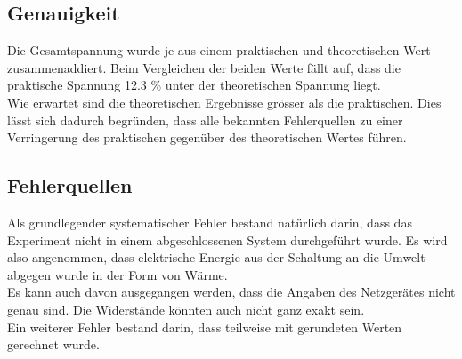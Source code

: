 \documentclass[a4paper,12pt]{article}
\begin{document}
\subsection{Genauigkeit}

Die Gesamtspannung wurde je aus einem praktischen und theoretischen Wert zusammenaddiert. Beim Vergleichen der beiden Werte fällt auf, dass die praktische Spannung 12.3 \% unter der theoretischen Spannung liegt.\\

Wie erwartet sind die theoretischen Ergebnisse grösser als die praktischen. Dies lässt sich dadurch begründen, dass alle bekannten Fehlerquellen zu einer Verringerung des praktischen gegenüber des theoretischen Wertes führen.





\subsection{Fehlerquellen}

Als grundlegender systematischer Fehler bestand natürlich darin, dass das Experiment nicht in einem abgeschlossenen System durchgeführt wurde. Es wird also angenommen, dass elektrische Energie aus der Schaltung an die Umwelt abgegen wurde in der Form von Wärme.\\

Es kann auch davon ausgegangen werden, dass die Angaben des Netzgerätes nicht genau sind. Die Widerstände könnten auch nicht ganz exakt sein.\\

Ein weiterer Fehler bestand darin, dass teilweise mit gerundeten Werten gerechnet wurde.\\

\end{document}
